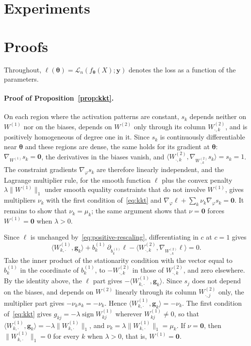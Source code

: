 \documentclass[twoside,11pt]{article}
\newcommand{\bth}{\boldsymbol{\theta}}
\newcommand{\by}{\mathbf{y}}
\newcommand{\bzero}{\mathbf{0}}
\newcommand{\Wone}{W^{(1)}}
\newcommand{\PenWone}{\|W^{(1)}\|_1}
\newcommand{\PenWonek}{\|W^{(1)}_{k, \cdot}\|_1}
\begin{document}
\section{Experiments}\label{sct:exp}

\appendix
\section{Proofs}\label{app:proofs}

Throughout, $\ell(\bth)=\mathcal L_n(f_{\bth}(X);\by)$ denotes the loss as a function of the parameters.

\paragraph{Proof of Proposition~\ref{prop:kkt}.}
On each region where the activation patterns are constant, $s_k$ depends neither on $\Wone$ nor on the biases, depends on $W^{(2)}$ only through its column $W^{(2)}_{\cdot,k}$, and is positively homogeneous of degree one in it. Since $s_k$ is continuously differentiable near $\bth$ and these regions are dense, the same holds for its gradient at $\bth$: $\nabla_{\Wone}s_k=\bzero$, the derivatives in the biases vanish, and $\langle W^{(2)}_{\cdot,k},\nabla_{W^{(2)}_{\cdot,k}}s_k\rangle=s_k=1$. The constraint gradients $\nabla_\varphi s_k$ are therefore linearly independent, and the Lagrange multiplier rule, for the smooth function $\ell$ plus the convex penalty $\lambda\PenWone$ under smooth equality constraints that do not involve $\Wone$, gives multipliers $\nu_k$ with the first condition of~\eqref{eq:kkt} and $\nabla_\varphi\ell+\sum_k\nu_k\nabla_\varphi s_k=\bzero$. It remains to show that $\nu_k=\mu_k$; the same argument shows that $\nu=\bzero$ forces $\Wone=\bzero$ when $\lambda>0$.

Since $\ell$ is unchanged by~\eqref{eq:positive-rescaling}, differentiating in $c$ at $c=1$ gives
\begin{equation*}
    \langle W^{(1)}_{k,\cdot},\mathbf g_k\rangle
    + b^{(1)}_k\,\partial_{b^{(1)}_k}\ell
    - \langle W^{(2)}_{\cdot,k},\nabla_{W^{(2)}_{\cdot,k}}\ell\rangle = 0 .
\end{equation*}
Take the inner product of the stationarity condition with the vector equal to $b^{(1)}_k$ in the coordinate of $b^{(1)}_k$, to $-W^{(2)}_{\cdot,k}$ in those of $W^{(2)}_{\cdot,k}$, and zero elsewhere. By the identity above, the $\ell$ part gives $-\langle W^{(1)}_{k,\cdot},\mathbf g_k\rangle$. Since $s_j$ does not depend on the biases, and depends on $W^{(2)}$ linearly through its column $W^{(2)}_{\cdot,j}$ only, the multiplier part gives $-\nu_ks_k=-\nu_k$. Hence $\langle W^{(1)}_{k,\cdot},\mathbf g_k\rangle=-\nu_k$. The first condition of~\eqref{eq:kkt} gives $g_{kj}=-\lambda\operatorname{sign}W^{(1)}_{kj}$ wherever $W^{(1)}_{kj}\neq0$, so that $\langle W^{(1)}_{k,\cdot},\mathbf g_k\rangle=-\lambda\PenWonek$, and $\nu_k=\lambda\PenWonek=\mu_k$. If $\nu=\bzero$, then $\PenWonek=0$ for every $k$ when $\lambda>0$, that is, $\Wone=\bzero$.
\end{document}
